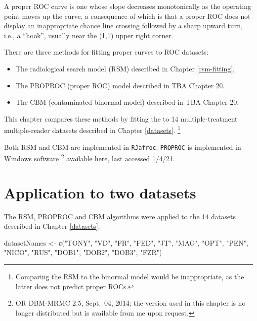 \documentclass[
]{book}
\newenvironment{Shaded}{\begin{snugshade}}{\end{snugshade}}
\newcommand{\KeywordTok}[1]{\textcolor[rgb]{0.13,0.29,0.53}{\textbf{#1}}}
\newcommand{\NormalTok}[1]{#1}
\newcommand{\StringTok}[1]{\textcolor[rgb]{0.31,0.60,0.02}{#1}}
\providecommand{\tightlist}{%
  \setlength{\itemsep}{0pt}\setlength{\parskip}{0pt}}
\begin{document}
A proper ROC curve is one whose slope decreases monotonically as the operating point moves up the curve, a consequence of which is that a proper ROC does not display an inappropriate chance line crossing followed by a sharp upward turn, i.e., a ``hook'', usually near the (1,1) upper right corner.

There are three methods for fitting proper curves to ROC datasets:

\begin{itemize}
\tightlist
\item
  The radiological search model (RSM) described in Chapter \ref{rsm-fitting},
\item
  The PROPROC (proper ROC) model described in TBA Chapter 20.
\item
  The CBM (contaminated binormal model) described in TBA Chapter 20.
\end{itemize}

This chapter compares these methods by fitting the to 14 multiple-treatment multiple-reader datasets described in Chapter \ref{datasets}. \footnote{Comparing the RSM to the binormal model would be inappropriate, as the latter does not predict proper ROCs.}

Both RSM and CBM are implemented in \texttt{RJafroc}. \texttt{PROPROC} is implemented in Windows software \footnote{OR DBM-MRMC 2.5, Sept.~04, 2014; the version used in this chapter is no longer distributed but is available from me upon request.} available \href{https://perception.lab.uiowa.edu/OR-DBM-MRMC-252}{here}, last accessed 1/4/21.

\hypertarget{rsm-3-fits-applications}{%
\section{Application to two datasets}\label{rsm-3-fits-applications}}

The RSM, PROPROC and CBM algorithms were applied to the 14 datasets described in Chapter \ref{datasets}.

\begin{Shaded}
\begin{Highlighting}[]
\NormalTok{datasetNames <-}\StringTok{  }
\StringTok{  }\KeywordTok{c}\NormalTok{(}\StringTok{"TONY"}\NormalTok{, }\StringTok{"VD"}\NormalTok{, }\StringTok{"FR"}\NormalTok{, }
  \StringTok{"FED"}\NormalTok{, }\StringTok{"JT"}\NormalTok{, }\StringTok{"MAG"}\NormalTok{, }
  \StringTok{"OPT"}\NormalTok{, }\StringTok{"PEN"}\NormalTok{, }\StringTok{"NICO"}\NormalTok{,}
  \StringTok{"RUS"}\NormalTok{, }\StringTok{"DOB1"}\NormalTok{, }\StringTok{"DOB2"}\NormalTok{, }
  \StringTok{"DOB3"}\NormalTok{, }\StringTok{"FZR"}\NormalTok{)}
\end{Highlighting}
\end{Shaded}
\end{document}
